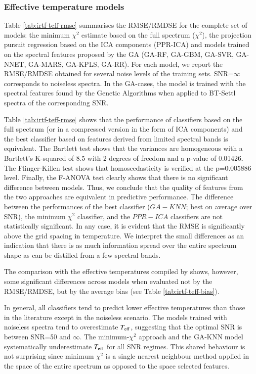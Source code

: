 
\subsubsection{Effective temperature models}
\label{sect:irtf-teff}

Table \ref{tab:irtf-teff-rmse} summarises the RMSE/RMDSE for the
complete set of models: the minimum $\chi^2$ estimate based on the
full spectrum ($\chi^2$), the projection pursuit regression based on
the ICA components (PPR-ICA) and models trained on the spectral
features proposed by the GA (GA-RF, GA-GBM, GA-SVR, GA-NNET, GA-MARS,
GA-KPLS, GA-RR). For each model, we report the RMSE/RMDSE obtained for
several noise levels of the training sets.  SNR=$\infty$ corresponds
to noiseless spectra. In the GA-cases, the model is trained with the
spectral features found by the Genetic Algorithms when applied to
BT-Settl spectra of the corresponding SNR.

Table \ref{tab:irtf-teff-rmse} shows that the performance of classifiers
based on the full spectrum (or in a compressed version in the form of
ICA components) and the best classifier based on features derived from
limited spectral bands is equivalent. The Bartlett test shows that the
variances are homogeneous with a Bartlett\textquoteright s K-squared
of 8.5 with 2 degrees of freedom and a p-value of 0.01426. The
Flinger-Killen test shows that homoscedasticity is verified at the
p=0.005886 level. Finally, the F-ANOVA test clearly shows that there
is no significant difference between models. Thus, we conclude that
the quality of features from the two approaches are equivalent in
predictive performance.  The difference between the performances of
the best classifier ($GA-KNN$; best on average over SNR), the minimum
$\chi^2$ classifier, and the $PPR-ICA$ classifiers are not
statistically significant. 
In any case, it is evident that the RMSE is significantly above the grid
spacing in temperature. We interpret the small differences as an
indication that there is as much information spread over the entire
spectrum shape as can be distilled from a few spectral bands.

The comparison with the effective temperatures compiled by
\cite{cesetti} shows, however, some significant differences across
models when evaluated not by the RMSE/RMDSE, but by the average bias
(see Table \ref{tab:irtf-teff-bias}). 

In general, all classifiers tend to predict lower effective
temperatures than those in the literature except in the noiseless
scenario. The models trained with noiseless spectra tend to
overestimate $T_{\rm eff}$, suggesting that the optimal SNR is between
SNR=50 and $\infty$. The minimum-$\chi^2$ approach and the GA-KNN
model systematically underestimate $T_{\rm eff}$ for all SNR
regimes. This shared behaviour is not surprising since minimum
$\chi^2$ is a single nearest neighbour method applied in the space of
the entire spectrum as opposed to the space selected features.

